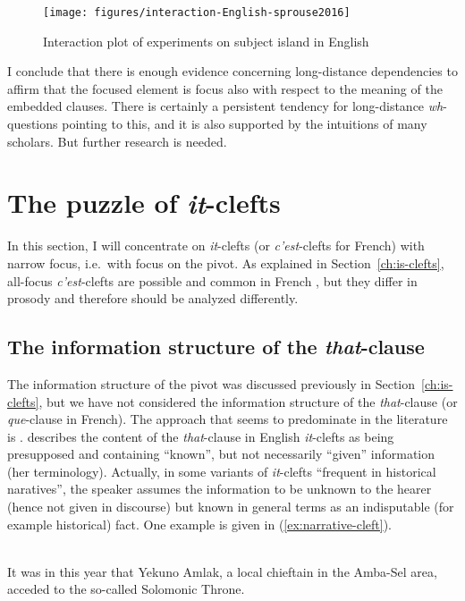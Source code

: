 \begin{figure}
    \texttt{[image: figures/interaction-English-sprouse2016]}
    \caption{Interaction plot of  experiments on subject island in English}
    \label{fig:results-sprouse-2016}
\end{figure}

I conclude that there is enough evidence concerning long-distance dependencies to affirm that the focused element is focus also with respect to the meaning of the embedded clauses. There is certainly a persistent tendency for long-distance \emph{wh}-questions pointing to this, and it is also supported by the intuitions of many scholars. But further research is needed.

\section{The puzzle of \emph{it}-clefts}
\label{ch:analysis-clefts}

In this section, I will concentrate on \emph{it}-clefts (or \emph{c'est}-clefts for French) with narrow focus, i.e.\ with focus on the pivot. As explained in Section~\ref{ch:is-clefts}, all-focus \emph{c'est}-clefts are possible and common in French \citep{Lambrecht.1994,Doetjes.2004}, but they differ in prosody \citep[541--549]{Doetjes.2004} and therefore should be analyzed differently.

\subsection{The information structure of the \textit{that}-clause}

The information structure of the pivot was discussed previously in Section~\ref{ch:is-clefts}, but we have not considered the information structure of the \textit{that}-clause (or \textit{que}-clause in French). The approach that seems to predominate in the literature is . \citeauthor{Prince.1978} describes the content of the \emph{that}-clause in English \emph{it}-clefts as being presupposed and containing ``known'', but not necessarily ``given'' information (her terminology). Actually, in some variants of \emph{it}-clefts ``frequent in historical naratives'', the speaker assumes the information to be unknown to the hearer (hence not given in discourse) but known in general terms as an indisputable (for example historical) fact. One example is given in (\ref{ex:narrative-cleft}).

\ea \citep[900]{Prince.1978}\\
It was in this year that Yekuno Amlak, a local chieftain in the
Amba-Sel area, acceded to the so-called Solomonic Throne. 
\label{ex:narrative-cleft}
\z 

